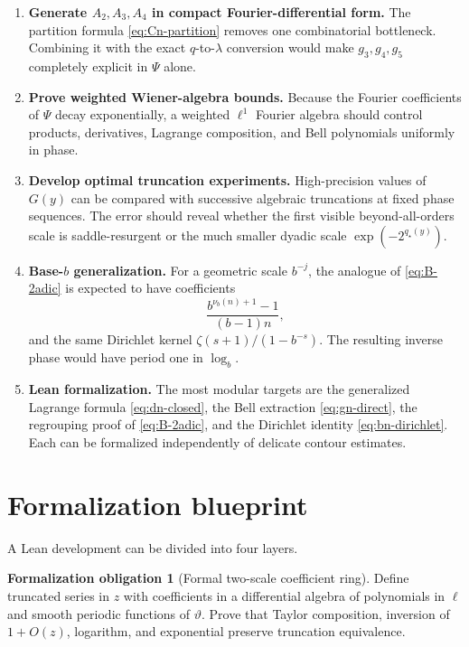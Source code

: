 \documentclass[11pt,oneside]{article}
\numberwithin{equation}{section}
\theoremstyle{definition}
\newtheorem{obligation}[theorem]{Formalization obligation}
\theoremstyle{remark}
\newcommand{\phase}{\vartheta}
\begin{document}
\begin{enumerate}
\item \textbf{Generate $A_2,A_3,A_4$ in compact Fourier-differential form.}
The partition formula \eqref{eq:Cn-partition} removes one combinatorial
bottleneck.  Combining it with the exact $q$-to-$\lambda$ conversion would make
$g_3,g_4,g_5$ completely explicit in $\Psi$ alone.

\item \textbf{Prove weighted Wiener-algebra bounds.}
Because the Fourier coefficients of $\Psi$ decay exponentially, a weighted
$\ell^1$ Fourier algebra should control products, derivatives, Lagrange
composition, and Bell polynomials uniformly in phase.

\item \textbf{Develop optimal truncation experiments.}
High-precision values of $G(y)$ can be compared with successive algebraic
truncations at fixed phase sequences.  The error should reveal whether the
first visible beyond-all-orders scale is saddle-resurgent or the much smaller
dyadic scale $\exp(-2^{q_\star(y)})$.

\item \textbf{Base-$b$ generalization.}
For a geometric scale $b^{-j}$, the analogue of \eqref{eq:B-2adic} is expected
to have coefficients
\[
 \frac{b^{\nu_b(n)+1}-1}{(b-1)n},
\]
and the same Dirichlet kernel $\zeta(s+1)/(1-b^{-s})$.  The resulting inverse
phase would have period one in $\log_b$.

\item \textbf{Lean formalization.}
The most modular targets are the generalized Lagrange formula
\eqref{eq:dn-closed}, the Bell extraction \eqref{eq:gn-direct}, the regrouping
proof of \eqref{eq:B-2adic}, and the Dirichlet identity
\eqref{eq:bn-dirichlet}.  Each can be formalized independently of delicate
contour estimates.
\end{enumerate}

\section{Formalization blueprint}
\label{sec:formalization}

A Lean development can be divided into four layers.

\begin{obligation}[Formal two-scale coefficient ring]
Define truncated series in $z$ with coefficients in a differential algebra of
polynomials in $\ell$ and smooth periodic functions of $\phase$.  Prove that
Taylor composition, inversion of $1+O(z)$, logarithm, and exponential preserve
truncation equivalence.
\end{obligation}
\end{document}
